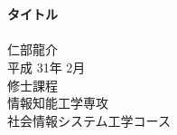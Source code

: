 \documentclass[11pt,oneside,notitlepage]{jsbook}
\begin{document}
\captiondelim{ }%
\rhead{\textbf{\thepage}}　　　%
\cfoot{}　　　　　　　　　　　%
\renewcommand{\headrulewidth}{0.4pt}
\renewcommand{\footrulewidth}{0.4pt}
\setlength{\baselineskip}{18.95pt}

\makeatletter
\renewcommand{\chapter}{
  \if@openright\cleardoublepage\else\clearpage\fi
  \global\@topnum\z@
  \secdef\@chapter\@schapter}
\makeatother

\vspace*{3cm}%
\begin{center}%
{\Large \textbf{}}\\%
\vspace{3mm}
{\Large \textbf{タイトル}} \\
\vspace{5cm}%
\indent \\
{\Large 仁部龍介} \\
\vspace{5mm}
{\Large 平成 31年 2月} \\
\vspace{5mm}
{\Large 修士課程 \\ 情報知能工学専攻 \\ 社会情報システム工学コース} \\
\end{center}%
\thispagestyle{empty}%


%

\frontmatter %
\clearpage %
\tableofcontents %
\mainmatter %






\backmatter          %


%     　　
\end{document}
